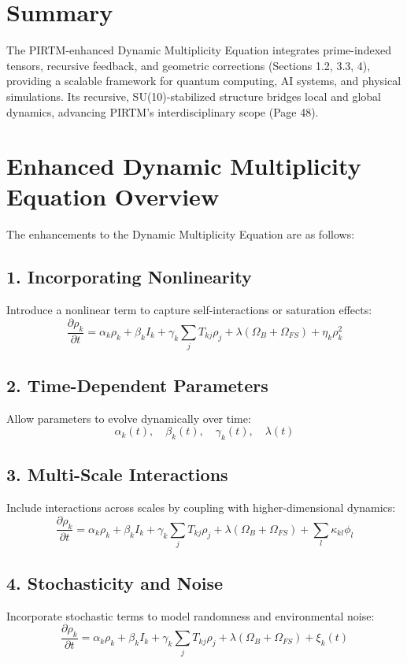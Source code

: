 \documentclass{article}
\theoremstyle{plain}
\theoremstyle{definition}
\begin{document}
\section*{Summary}
The PIRTM-enhanced Dynamic Multiplicity Equation integrates prime-indexed tensors, recursive feedback, and geometric corrections (Sections 1.2, 3.3, 4), providing a scalable framework for quantum computing, AI systems, and physical simulations. Its recursive, SU(10)-stabilized structure bridges local and global dynamics, advancing PIRTM’s interdisciplinary scope (Page 48).
\section*{Enhanced Dynamic Multiplicity Equation Overview}

The enhancements to the Dynamic Multiplicity Equation are as follows:

\subsection*{1. Incorporating Nonlinearity}
Introduce a nonlinear term to capture self-interactions or saturation effects:
\begin{equation}
\frac{\partial \rho_k}{\partial t} = \alpha_k \rho_k + \beta_k I_k + \gamma_k \sum_j T_{kj} \rho_j + \lambda (\Omega_B + \Omega_{FS}) + \eta_k \rho_k^2
\end{equation}

\subsection*{2. Time-Dependent Parameters}
Allow parameters to evolve dynamically over time:
\begin{equation}
\alpha_k(t), \quad \beta_k(t), \quad \gamma_k(t), \quad \lambda(t)
\end{equation}

\subsection*{3. Multi-Scale Interactions}
Include interactions across scales by coupling with higher-dimensional dynamics:
\begin{equation}
\frac{\partial \rho_k}{\partial t} = \alpha_k \rho_k + \beta_k I_k + \gamma_k \sum_j T_{kj} \rho_j + \lambda (\Omega_B + \Omega_{FS}) + \sum_l \kappa_{kl} \phi_l
\end{equation}

\subsection*{4. Stochasticity and Noise}
Incorporate stochastic terms to model randomness and environmental noise:
\begin{equation}
\frac{\partial \rho_k}{\partial t} = \alpha_k \rho_k + \beta_k I_k + \gamma_k \sum_j T_{kj} \rho_j + \lambda (\Omega_B + \Omega_{FS}) + \xi_k(t)
\end{equation}
\end{document}
